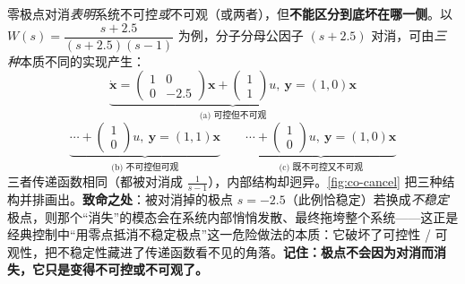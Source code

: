 \begin{pitfall}
零极点对消\emph{表明}系统不可控\emph{或}不可观（或两者），但\textbf{不能区分到底坏在哪一侧}\cite{liubao2006modern}。以 $W(s)=\dfrac{s+2.5}{(s+2.5)(s-1)}$ 为例，分子分母公因子 $(s+2.5)$ 对消，可由\emph{三种}本质不同的实现产生：
\[
  \underbrace{\dot{\mathbf{x}}=\begin{pmatrix}1&0\\0&-2.5\end{pmatrix}\mathbf{x}+\begin{pmatrix}1\\1\end{pmatrix}u,\ \mathbf{y}=(1,0)\mathbf{x}}_{\text{(a) 可控但不可观}}
\]
\[
  \underbrace{\cdots+\begin{pmatrix}1\\0\end{pmatrix}u,\ \mathbf{y}=(1,1)\mathbf{x}}_{\text{(b) 不可控但可观}}\qquad
  \underbrace{\cdots+\begin{pmatrix}1\\0\end{pmatrix}u,\ \mathbf{y}=(1,0)\mathbf{x}}_{\text{(c) 既不可控又不可观}}
\]
三者传递函数相同（都被对消成 $\frac{1}{s-1}$），内部结构却迥异。\cref{fig:co-cancel} 把三种结构并排画出。\textbf{致命之处}：被对消掉的极点 $s=-2.5$（此例恰稳定）若换成\emph{不稳定}极点，则那个“消失”的模态会在系统内部悄悄发散、最终拖垮整个系统——这正是经典控制中“用零点抵消不稳定极点”这一危险做法的本质：它破坏了可控性 / 可观性，把不稳定性藏进了传递函数看不见的角落。\textbf{记住：极点不会因为对消而消失，它只是变得不可控或不可观了。}
\end{pitfall}

